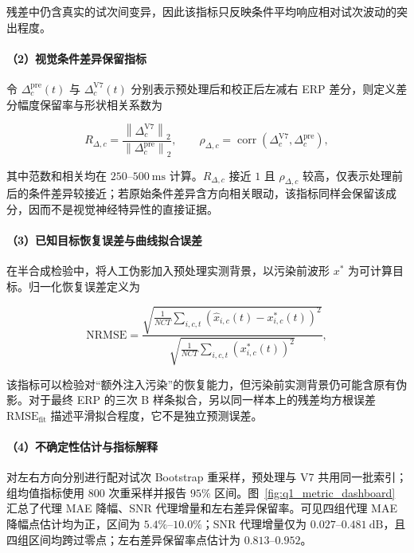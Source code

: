 \documentclass[a4paper,zihao=-4,linespread=1]{ctexart}
\numberwithin{figure}{section}       %
\begin{document}
残差中仍含真实的试次间变异，因此该指标只反映条件平均响应相对试次波动的突出程度。

\paragraph{（2）视觉条件差异保留指标}

令 $\Delta_c^{\mathrm{pre}}(t)$ 与 $\Delta_c^{\mathrm{V7}}(t)$ 分别表示预处理后和校正后左减右 ERP 差分，则定义差分幅度保留率与形状相关系数为

\begin{equation}
    R_{\Delta,c}=
    \frac{\left\|\Delta_c^{\mathrm{V7}}\right\|_2}
    {\left\|\Delta_c^{\mathrm{pre}}\right\|_2},
    \qquad
    \rho_{\Delta,c}=\operatorname{corr}
    \left(\Delta_c^{\mathrm{V7}},\Delta_c^{\mathrm{pre}}\right),
    \label{eq:q1_retention}
\end{equation}

其中范数和相关均在 $250$--$500~\mathrm{ms}$ 计算。$R_{\Delta,c}$ 接近 $1$ 且 $\rho_{\Delta,c}$ 较高，仅表示处理前后的条件差异较接近；若原始条件差异含方向相关眼动，该指标同样会保留该成分，因而不是视觉神经特异性的直接证据。

\paragraph{（3）已知目标恢复误差与曲线拟合误差}

在半合成检验中，将人工伪影加入预处理实测背景，以污染前波形 $x^{\ast}$ 为可计算目标。归一化恢复误差定义为

\begin{equation}
    \mathrm{NRMSE}=
    \frac{\sqrt{\frac{1}{NCT}\sum_{i,c,t}\left(\hat{x}_{i,c}(t)-x^{\ast}_{i,c}(t)\right)^2}}
    {\sqrt{\frac{1}{NCT}\sum_{i,c,t}\left(x^{\ast}_{i,c}(t)\right)^2}},
    \label{eq:q1_nrmse}
\end{equation}

该指标可以检验对“额外注入污染”的恢复能力，但污染前实测背景仍可能含原有伪影。对于最终 ERP 的三次 B 样条拟合，另以同一样本上的残差均方根误差 $\mathrm{RMSE}_{\mathrm{fit}}$ 描述平滑拟合程度，它不是独立预测误差。

\paragraph{（4）不确定性估计与指标解释}

对左右方向分别进行配对试次 Bootstrap 重采样，预处理与 V7 共用同一批索引；组均值指标使用 $800$ 次重采样并报告 $95\%$ 区间。图~\ref{fig:q1_metric_dashboard} 汇总了代理 MAE 降幅、SNR 代理增量和左右差异保留率。可见四组代理 MAE 降幅点估计均为正，区间为 $5.4\%$--$10.0\%$；SNR 代理增量仅为 $0.027$--$0.481~\mathrm{dB}$，且四组区间均跨过零点；左右差异保留率点估计为 $0.813$--$0.952$。
\end{document}
